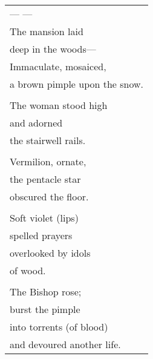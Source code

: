 \documentclass{article}
\begin{document}
\begin{tabular}{l}
\\
--- --- \\
The mansion laid \\
deep in the woods--- \\
Immaculate, mosaiced, \\
a brown pimple upon the snow. \\
\\
The woman stood high \\
and adorned \\
the stairwell rails. \\
\\
Vermilion, ornate, \\
the pentacle star \\
obscured the floor. \\
\\
Soft violet (lips) \\
spelled prayers \\
overlooked by idols \\
of wood. \\
\\
The Bishop rose; \\
burst the pimple \\
into torrents (of blood) \\
and devoured another life. \\
\end{tabular} \\
\end{document}
